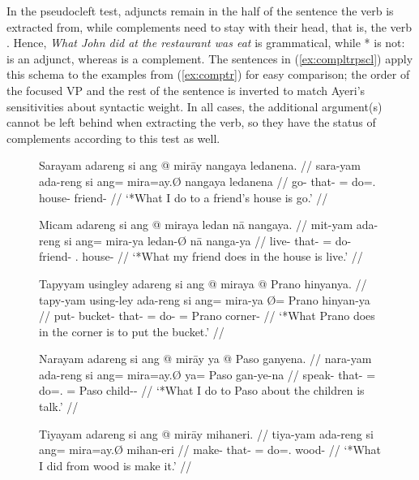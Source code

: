 In the pseudocleft test, adjuncts remain in the half of the sentence the verb
is extracted from, while complements need to stay with their head, that is, the
verb \parencite[compare][407--408]{needhamtoivonen2011}. Hence, \emph{What John
did at the restaurant was eat} is grammatical, while * is not:  is an adjunct, whereas
 is a complement. The sentences in (\ref{ex:compltrpscl})
apply this schema to the examples from (\ref{ex:comptr}) for easy comparison;
the order of the focused VP and the rest of the sentence is inverted to match
Ayeri's sensitivities about syntactic weight. In all cases, the additional
argument(s) cannot be left behind when extracting the verb, so they have the
status of complements according to this test as well.

\begin{figure}
\pex\label{ex:compltrpscl}
\a\label{ex:compltrpscl_1}%
\ljudge*\begingl
	\gla Sarayam adareng si ang @ mirāy nangaya ledanena. //
	\glb sara-yam ada-reng si ang= mira=ay.Ø nangaya ledanena //
	\glc go-\Ptcp{} that-\AargI{} \Rel{} \AgtT{}= do=\Fsg{}.\Top{} house-\Loc{}
		friend-\Gen{} //
	\glft `*What I do to a friend's house is go.' //
\endgl

\a\label{ex:compltrpscl_2}%
\ljudge*\begingl
	\gla Micam adareng si ang @ miraya ledan nā nangaya. //
	\glb mit-yam ada-reng si ang= mira-ya ledan-Ø nā nanga-ya //
	\glc live-\Ptcp{} that-\AargI{} \Rel{} \AgtT{}= do-\TsgM{} friend-\Top{}
		\Fsg{}.\Gen{} house-\Loc{} //
	\glft `*What my friend does in the house is live.' //
\endgl

\a\label{ex:compltrpscl_3}%
\ljudge*\begingl
	\gla Tapyyam usingley adareng si ang @ miraya {} @ Prano hinyanya. //
	\glb tapy-yam using-ley ada-reng si ang= mira-ya Ø= Prano hinyan-ya //
	\glc put-\Ptcp{} bucket-\PargI{} that-\AargI{} \Rel{} \AgtT{}= do-\TsgM{}
		\Top {}= Prano corner-\Loc{} //
	\glft `*What Prano does in the corner is to put the bucket.' //
\endgl

\a\label{ex:compltrpscl_4}%
\ljudge*\begingl
	\gla Narayam adareng si ang @ mirāy ya @ Paso ganyena. //
	\glb nara-yam ada-reng si ang= mira=ay.Ø ya= Paso gan-ye-na //
	\glc speak-\Ptcp{} that-\AargI{} \Rel{} \AgtT{}= do=\Fsg{}.\Top{} \Loc{}=
		Paso child-\Pl{}-\Gen{} //
	\glft `*What I do to Paso about the children is talk.' //
\endgl

\a\label{ex:compltrpscl_5}%
\ljudge*\begingl
	\gla Tiyayam adareng si ang @ mirāy mihaneri. //
	\glb tiya-yam ada-reng si ang= mira=ay.Ø mihan-eri //
	\glc make-\Ptcp{} that-\AargI{} \Rel{} \AgtT{}= do=\Fsg{}.\Top{}
		wood-\Ins{} //
	\glft `*What I did from wood is make it.' //
\endgl

\xe
\end{figure}


